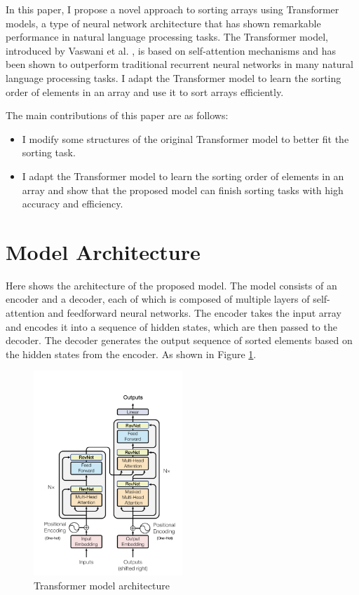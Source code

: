 \documentclass{article}
\begin{document}
In this paper, I propose a novel approach to sorting arrays using Transformer models, a type of neural network architecture that has shown remarkable performance in natural language processing tasks. The Transformer model, introduced by Vaswani et al. \cite{vaswani2017attention}, is based on self-attention mechanisms and has been shown to outperform traditional recurrent neural networks in many natural language processing tasks. I adapt the Transformer model to learn the sorting order of elements in an array and use it to sort arrays efficiently.

The main contributions of this paper are as follows:
\begin{itemize}
    \item I modify some structures of the original Transformer model to better fit the sorting task.
    \item I adapt the Transformer model to learn the sorting order of elements in an array and show that the proposed model can finish sorting tasks with high accuracy and efficiency.
\end{itemize}


\section{Model Architecture}
Here shows the architecture of the proposed model. The model consists of an encoder and a decoder, each of which is composed of multiple layers of self-attention and feedforward neural networks. The encoder takes the input array and encodes it into a sequence of hidden states, which are then passed to the decoder. The decoder generates the output sequence of sorted elements based on the hidden states from the encoder. As shown in Figure \ref{Transformer model architecture}.

\begin{figure}
    \centering
    \includegraphics[width=0.5\textwidth]{picture/transformer.png}
    \caption{Transformer model architecture}
    \label{Transformer model architecture}
\end{figure}
\end{document}
